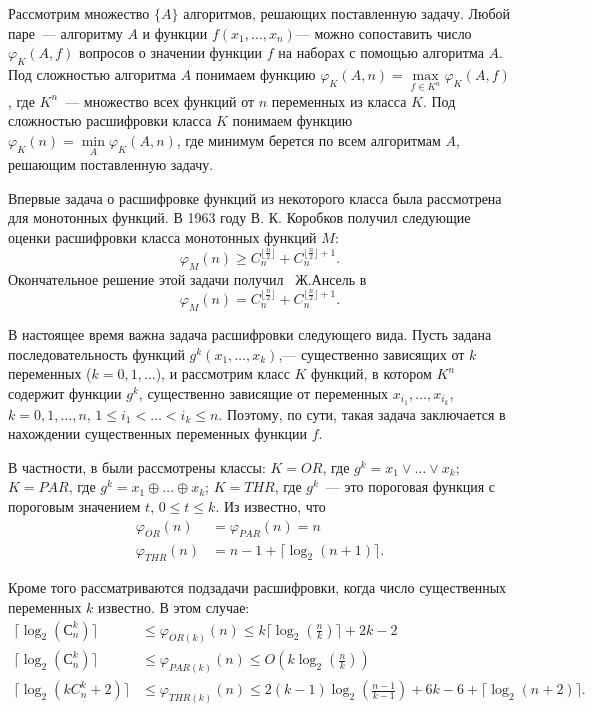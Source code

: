 \documentclass[oneside, final, 14pt]{extreport}
\begin{document}
	Рассмотрим множество $\{A\}$ алгоритмов, решающих поставленную задачу. Любой паре~--- алгоритму $A$ и функции $f(x_1, \ldots, x_n)$--- 
	можно сопоставить число $\varphi_K(A,f)$ вопросов о значении функции $f$ на наборах с помощью алгоритма $A$. Под сложностью  
	алгоритма $A$ понимаем функцию $\varphi_K(A,n) = \max\limits_{f \in K^n}\varphi_K(A, f)$, где $K^n$~--- множество всех функций от $n$ переменных
	из класса $K$. Под сложностью расшифровки класса $K$ понимаем функцию $\varphi_K(n) = \min\limits_A\varphi_K(A, n)$, где минимум берется по всем 
	алгоритмам $A$, решающим поставленную задачу.
	
	Впервые задача о расшифровке функций из некоторого класса была рассмотрена для монотонных функций. В 1963 году В. К. Коробков  \cite{korobkov}
	получил следующие оценки расшифровки класса монотонных функций $M$: 
	$$ \varphi_M(n) \geq C_n^{\lfloor \frac{n}{2} \rfloor} +  C_n^{\lfloor \frac{n}{2} \rfloor +1}.$$
	Окончательное решение этой задачи получил  Ж.Ансель в \cite{hansel}  
	$$ \varphi_M(n) = C_n^{\lfloor \frac{n}{2} \rfloor} +  C_n^{\lfloor \frac{n}{2} \rfloor +1}. $$

	В настоящее время важна задача расшифровки следующего вида. Пусть задана последовательность функций $g^k(x_1, \ldots, x_k)$,--- существенно 
	зависящих от $k$ переменных ($k = 0, 1, \ldots$), и рассмотрим класс $K$ функций, в котором $K^n$ содержит функции $g^k$, существенно зависящие  
	от переменных $x_{i_1}, \ldots, x_{i_k}$, $k = 0,1, \ldots, n$, $1 \leq i_1 < \ldots < i_k \leq n$. Поэтому, по сути, такая задача заключается в нахождении 
	существенных переменных функции $f$.
	
	В частности, в \cite{tokio} были рассмотрены классы: $K = OR$, где $g^k = x_1 \vee \ldots \vee x_k$; $K = PAR$, где $g^k = x_1 \oplus \ldots \oplus x_k$;
	$K = THR$, где $g^k$~--- это пороговая функция с пороговым значением $t$, $0 \leq t \leq k$. Из \cite{tokio} известно, что
	$$
	\begin{aligned}
		\varphi_{OR}(n) & = \varphi_{PAR}(n) = n \\
		\varphi_{THR}(n)&= n - 1 + \lceil \log_2(n+1) \rceil.
	\end{aligned} 
	$$
	
	Кроме того рассматриваются подзадачи расшифровки, когда число существенных переменных $k$ известно. В этом случае:
	$$
	\begin{aligned}
	       \lceil \log_2(С_n^k) \rceil & \leq \varphi_{OR(k)}(n) \leq k\lceil \log_2(\frac{n}{k}) \rceil + 2k - 2 \\
	        \lceil \log_2(С_n^k) \rceil & \leq \varphi_{PAR(k)}(n) \leq O(k\log_2(\frac{n}{k})) \\
	\lceil \log_2(kC_n^k + 2) \rceil & \leq \varphi_{THR(k)}(n) \leq 2(k-1)\log_2\left(\frac{n-1}{k-1}\right) + 6k - 6 + \lceil \log_2(n+2) \rceil.
	\end{aligned} 
	$$
	
\end{document}
